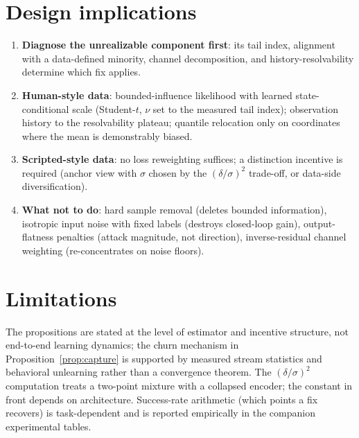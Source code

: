\documentclass[11pt]{article}
\begin{document}
\section{Design implications}

\begin{enumerate}[leftmargin=1.4em]
\item \textbf{Diagnose the unrealizable component first}: its tail index,
alignment with a data-defined minority, channel decomposition, and
history-resolvability determine which fix applies.
\item \textbf{Human-style data}: bounded-influence likelihood with learned
state-conditional scale (Student-$t$, $\nu$ set to the measured tail index);
observation history to the resolvability plateau; quantile relocation only on
coordinates where the mean is demonstrably biased.
\item \textbf{Scripted-style data}: no loss reweighting suffices; a
distinction incentive is required (anchor view with $\sigma$ chosen by the
$(\delta/\sigma)^2$ trade-off, or data-side diversification).
\item \textbf{What not to do}: hard sample removal (deletes bounded
information), isotropic input noise with fixed labels (destroys closed-loop
gain), output-flatness penalties (attack magnitude, not direction), inverse-residual
channel weighting (re-concentrates on noise floors).
\end{enumerate}

\section{Limitations}

The propositions are stated at the level of estimator and incentive structure,
not end-to-end learning dynamics; the churn mechanism in
Proposition~\ref{prop:capture} is supported by measured stream statistics and
behavioral unlearning rather than a convergence theorem. The $(\delta/\sigma)^2$
computation treats a two-point mixture with a collapsed encoder; the constant in
front depends on architecture. Success-rate arithmetic (which points a fix
recovers) is task-dependent and is reported empirically in the companion
experimental tables.
\end{document}
